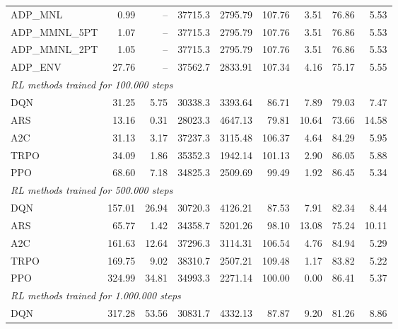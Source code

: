 \begin{samepage}
\begin{center}
\begin{tabular}{l|rr|rr|rr|rr}
    \midrule
    ADP\_MNL     &     0.99 &    -- &    37715.3 &    2795.79 &  107.76 &    3.51 &   76.86 &    5.53 \\
    ADP\_MMNL\_5PT &     1.07 &    -- &    37715.3 &    2795.79 &  107.76 &    3.51 &   76.86 &    5.53 \\
    ADP\_MMNL\_2PT &     1.05 &    -- &    37715.3 &    2795.79 &  107.76 &    3.51 &   76.86 &    5.53 \\
    ADP\_ENV     &    27.76 &    -- &    37562.7 &    2833.91 &  107.34 &    4.16 &   75.17 &    5.55 \\
    \midrule
    \multicolumn{9}{l}{\textit{RL methods trained for 100.000 steps}} \\
    \midrule
    DQN          &    31.25 &     5.75 &    30338.3 &    3393.64 &   86.71 &    7.89 &   79.03 &    7.47 \\
    ARS          &    13.16 &     0.31 &    28023.3 &    4647.13 &   79.81 &   10.64 &   73.66 &   14.58 \\
    A2C          &    31.13 &     3.17 &    37237.3 &    3115.48 &  106.37 &    4.64 &   84.29 &    5.95 \\
    TRPO         &    34.09 &     1.86 &    35352.3 &    1942.14 &  101.13 &    2.90 &   86.05 &    5.88 \\
    PPO          &    68.60 &     7.18 &    34825.3 &    2509.69 &   99.49 &    1.92 &   86.45 &    5.34 \\
    \midrule
    \multicolumn{9}{l}{\textit{RL methods trained for 500.000 steps}} \\
    \midrule
    DQN          &   157.01 &    26.94 &    30720.3 &    4126.21 &   87.53 &    7.91 &   82.34 &    8.44 \\
    ARS          &    65.77 &     1.42 &    34358.7 &    5201.26 &   98.10 &   13.08 &   75.24 &   10.11 \\
    A2C          &   161.63 &    12.64 &    37296.3 &    3114.31 &  106.54 &    4.76 &   84.94 &    5.29 \\
    TRPO         &   169.75 &     9.02 &    38310.7 &    2507.21 &  109.48 &    1.17 &   83.82 &    5.22 \\
    PPO          &   324.99 &    34.81 &    34993.3 &    2271.14 &  100.00 &    0.00 &   86.41 &    5.37 \\
    \midrule
    \multicolumn{9}{l}{\textit{RL methods trained for 1.000.000 steps}} \\
    \midrule
    DQN          &   317.28 &    53.56 &    30831.7 &    4332.13 &   87.87 &    9.20 &   81.26 &    8.86 \\

\end{tabular}
\end{center}
\end{samepage}
